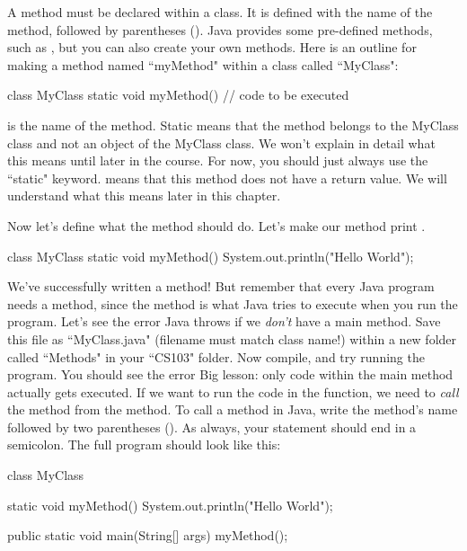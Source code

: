 A method must be declared within a class. It is defined with the name of the method, followed by parentheses (). Java provides some pre-defined methods, such as , but you can also create your own methods. Here is an outline for making a method named ``myMethod" within a class called ``MyClass": 

\begin{code}
class MyClass {
  static void myMethod() {
    // code to be executed
  }
}
\end{code}

 is the name of the method. Static means that the method belongs to the MyClass class and not an object of the MyClass class. We won't explain in detail what this means until later in the course. For now, you should just always use the ``static" keyword.  means that this method does not have a return value. We will understand what this means later in this chapter. 

Now let's define what the method should do. Let's make our method print . 
\begin{code}
class MyClass {
  static void myMethod() {
    System.out.println("Hello World");
  }
}
\end{code}

We've successfully written a method! But remember that every Java program needs a  method, since the  method is what Java tries to execute when you run the program. Let's see the error Java throws if we \emph{don't} have a main method. Save this file as ``MyClass.java" (filename must match class name!) within a new folder called ``Methods" in your ``CS103" folder. Now compile, and try running the program. You should see the error  Big lesson: only code within the main method actually gets executed. If we want to run the code in the  function, we need to \emph{call} the  method from the  method. To call a method in Java, write the method's name followed by two parentheses (). As always, your statement should end in a semicolon. The full program should look like this: 

\begin{code}
class MyClass {
  static void myMethod() {
    System.out.println("Hello World");
  }

  public static void main(String[] args) {
    myMethod();
  }
}
\end{code}

